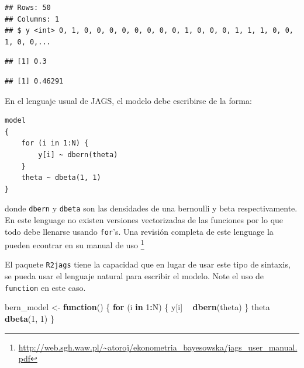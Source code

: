 \documentclass[
  12pt,
]{book}
\newenvironment{Shaded}{\begin{snugshade}}{\end{snugshade}}
\newcommand{\ControlFlowTok}[1]{\textcolor[rgb]{0.13,0.29,0.53}{\textbf{#1}}}
\newcommand{\DecValTok}[1]{\textcolor[rgb]{0.00,0.00,0.81}{#1}}
\newcommand{\KeywordTok}[1]{\textcolor[rgb]{0.13,0.29,0.53}{\textbf{#1}}}
\newcommand{\NormalTok}[1]{#1}
\newcommand{\OperatorTok}[1]{\textcolor[rgb]{0.81,0.36,0.00}{\textbf{#1}}}
\newcommand{\StringTok}[1]{\textcolor[rgb]{0.31,0.60,0.02}{#1}}
\theoremstyle{definition}
\theoremstyle{definition}
\theoremstyle{definition}
\theoremstyle{remark}
\begin{document}
\begin{verbatim}
## Rows: 50
## Columns: 1
## $ y <int> 0, 1, 0, 0, 0, 0, 0, 0, 0, 0, 1, 0, 0, 0, 1, 1, 1, 0, 0, 1, 0, 0,...
\end{verbatim}

\begin{Shaded}
\end{Shaded}

\begin{verbatim}
## [1] 0.3
\end{verbatim}

\begin{Shaded}
\end{Shaded}

\begin{verbatim}
## [1] 0.46291
\end{verbatim}

En el lenguaje usual de JAGS, el modelo debe escribirse de la forma:

\begin{verbatim}
model
{
    for (i in 1:N) {
        y[i] ~ dbern(theta)
    }
    theta ~ dbeta(1, 1)
}
\end{verbatim}

donde \texttt{dbern} y \texttt{dbeta} son las densidades de una bernoulli y beta respectivamente. En este lenguage no existen versiones vectorizadas de las funciones por lo que todo debe llenarse usando \texttt{for}'s. Una revisión completa de este lenguage la pueden econtrar en su manual de uso \footnote{\url{http://web.sgh.waw.pl/~atoroj/ekonometria_bayesowska/jags_user_manual.pdf}}

El paquete \texttt{R2jags} tiene la capacidad que en lugar de usar este tipo de sintaxis, se pueda usar el lenguaje natural para escribir el modelo. Note el uso de \texttt{function} en este caso.

\begin{Shaded}
\begin{Highlighting}[]
\NormalTok{bern_model <-}\StringTok{ }\ControlFlowTok{function}\NormalTok{() \{}
    \ControlFlowTok{for}\NormalTok{ (i }\ControlFlowTok{in} \DecValTok{1}\OperatorTok{:}\NormalTok{N) \{}
\NormalTok{        y[i] }\OperatorTok{~}\StringTok{ }\KeywordTok{dbern}\NormalTok{(theta)}
\NormalTok{    \}}
\NormalTok{    theta }\OperatorTok{~}\StringTok{ }\KeywordTok{dbeta}\NormalTok{(}\DecValTok{1}\NormalTok{, }\DecValTok{1}\NormalTok{)}
\NormalTok{\}}
\end{Highlighting}
\end{Shaded}
\end{document}
